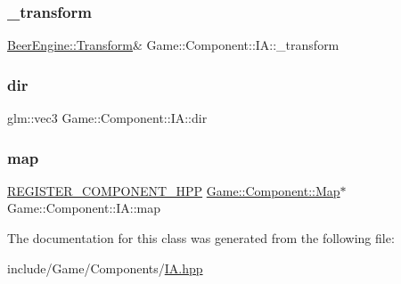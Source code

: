 \subsubsection{\texorpdfstring{\+\_\+transform}{\_transform}}
{\footnotesize\ttfamily \mbox{\hyperlink{class_beer_engine_1_1_transform}{Beer\+Engine\+::\+Transform}}\& Game\+::\+Component\+::\+I\+A\+::\+\_\+transform\hspace{0.3cm}{\ttfamily [protected]}}

\mbox{\label{class_game_1_1_component_1_1_i_a_a4996d461d576a2ffff66e4b33d9d84e2}} 
\subsubsection{\texorpdfstring{dir}{dir}}
{\footnotesize\ttfamily glm\+::vec3 Game\+::\+Component\+::\+I\+A\+::dir\hspace{0.3cm}{\ttfamily [protected]}}

\mbox{\label{class_game_1_1_component_1_1_i_a_a2ae49ef7e89503294de091af505fce74}} 
\subsubsection{\texorpdfstring{map}{map}}
{\footnotesize\ttfamily \mbox{\hyperlink{_core_8hpp_a895cfc16b36b6c309f80b98ded63df4f}{R\+E\+G\+I\+S\+T\+E\+R\+\_\+\+C\+O\+M\+P\+O\+N\+E\+N\+T\+\_\+\+H\+PP}} \mbox{\hyperlink{class_game_1_1_component_1_1_map}{Game\+::\+Component\+::\+Map}}$\ast$ Game\+::\+Component\+::\+I\+A\+::map}



The documentation for this class was generated from the following file\+:\begin{DoxyCompactItemize}
\item 
include/\+Game/\+Components/\mbox{\hyperlink{_i_a_8hpp}{I\+A.\+hpp}}\end{DoxyCompactItemize}
